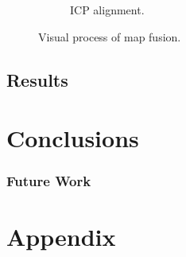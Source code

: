 \documentclass[letterpaper, oneside, 10pt]{report}
\begin{document}
\begin{figure}[h]
\begin{subfigure}[h]{0.31\textwidth}
        \caption{ICP alignment.}
        \label{fig:ICP alignment.}
    \end{subfigure}
    \caption{Visual process of map fusion.}
    \label{fig:Visual process of map fusion.}
\end{figure}

\section{Results}

\chapter{Conclusions}

\subsection{Future Work}



\chapter{Appendix}

\clearpage



\end{document}
